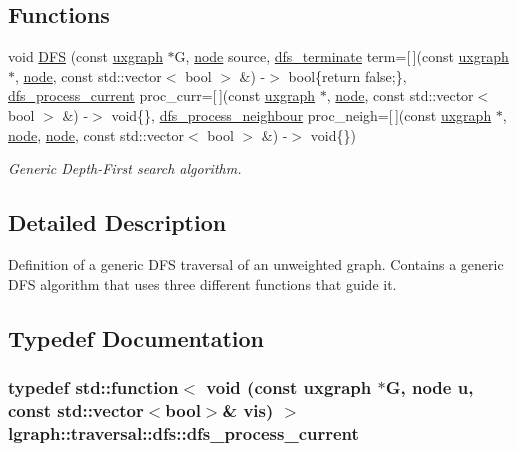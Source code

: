 \subsection*{Functions}
\begin{DoxyCompactItemize}
\item 
void \hyperlink{namespacelgraph_1_1traversal_1_1dfs_aaf33f8a050e79af44de6b864fe8e5e58}{D\-F\-S} (const \hyperlink{classlgraph_1_1uxgraph}{uxgraph} $\ast$G, \hyperlink{namespacelgraph_a397169dd66adf725210a30fb7251773e}{node} source, \hyperlink{namespacelgraph_1_1traversal_1_1dfs_addcc00649966bb285b85c134c78c44b5}{dfs\-\_\-terminate} term=\mbox{[}$\,$\mbox{]}(const \hyperlink{classlgraph_1_1uxgraph}{uxgraph} $\ast$, \hyperlink{namespacelgraph_a397169dd66adf725210a30fb7251773e}{node}, const std\-::vector$<$ bool $>$ \&) -\/$>$ bool\{return false;\}, \hyperlink{namespacelgraph_1_1traversal_1_1dfs_a9bee9010c5bda8980b868d1241c0097a}{dfs\-\_\-process\-\_\-current} proc\-\_\-curr=\mbox{[}$\,$\mbox{]}(const \hyperlink{classlgraph_1_1uxgraph}{uxgraph} $\ast$, \hyperlink{namespacelgraph_a397169dd66adf725210a30fb7251773e}{node}, const std\-::vector$<$ bool $>$ \&) -\/$>$ void\{\}, \hyperlink{namespacelgraph_1_1traversal_1_1dfs_af81a65d0c3b375b2c31d4b7e9d707039}{dfs\-\_\-process\-\_\-neighbour} proc\-\_\-neigh=\mbox{[}$\,$\mbox{]}(const \hyperlink{classlgraph_1_1uxgraph}{uxgraph} $\ast$, \hyperlink{namespacelgraph_a397169dd66adf725210a30fb7251773e}{node}, \hyperlink{namespacelgraph_a397169dd66adf725210a30fb7251773e}{node}, const std\-::vector$<$ bool $>$ \&) -\/$>$ void\{\})
\begin{DoxyCompactList}\small\item\em Generic Depth-\/\-First search algorithm. \end{DoxyCompactList}\end{DoxyCompactItemize}


\subsection{Detailed Description}
Definition of a generic D\-F\-S traversal of an unweighted graph. Contains a generic D\-F\-S algorithm that uses three different functions that guide it. 

\subsection{Typedef Documentation}
\hypertarget{namespacelgraph_1_1traversal_1_1dfs_a9bee9010c5bda8980b868d1241c0097a}{
\subsubsection[{dfs\-\_\-process\-\_\-current}]{\setlength{\rightskip}{0pt plus 5cm}typedef std\-::function$<$ void (const {\bf uxgraph} $\ast$G, {\bf node} u, const std\-::vector$<$bool$>$\& vis) $>$ {\bf lgraph\-::traversal\-::dfs\-::dfs\-\_\-process\-\_\-current}}}\label{namespacelgraph_1_1traversal_1_1dfs_a9bee9010c5bda8980b868d1241c0097a}


